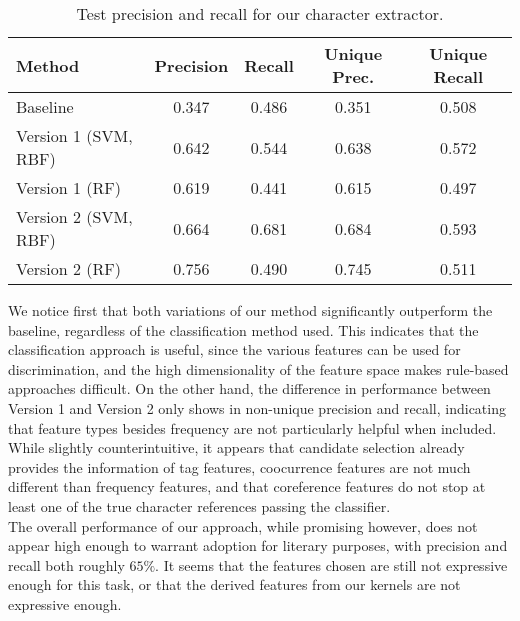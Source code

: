 \documentclass[12pt]{article}
\begin{document}
        \begin{table}[H]
        \begin{center}
            \begin{tabular}{l|c|c|c|c}
                \textbf{Method} & \textbf{Precision} & \textbf{Recall} & \textbf{Unique Prec.} & \textbf{Unique Recall} \\
                \hline
                Baseline & 0.347 & 0.486 & 0.351 & 0.508 \\
                \hline
                Version 1 (SVM, RBF) & 0.642 & 0.544  & 0.638 & 0.572 \\
                \hline
                Version 1 (RF) & 0.619 & 0.441 & 0.615 & 0.497 \\
                \hline
                Version 2 (SVM, RBF) & 0.664 & 0.681 & 0.684 & 0.593 \\
                \hline
                Version 2 (RF) & 0.756 & 0.490 & 0.745 & 0.511  
                
            \end{tabular}
        \end{center}
        \caption{Test precision and recall for our character extractor.}
        \end{table}
        We notice first that both variations of our method significantly outperform the baseline, regardless
        of the classification method used. This indicates that the classification approach is useful,
        since the various features can be used for discrimination, and the high dimensionality of the feature
        space makes rule-based approaches difficult. On the other hand, the difference in performance
        between Version 1 and Version 2 only shows in non-unique precision and recall, indicating that
        feature types besides frequency are not particularly helpful when included. While slightly
        counterintuitive, it appears that candidate selection already provides the information of tag
        features, coocurrence features are not much different than frequency features, and that coreference
        features do not stop at least one of the true character references passing the classifier. \\

        The overall performance of our approach, while promising however, does not appear high enough to warrant
        adoption for literary purposes, with precision and recall both roughly $65\%$. It seems 
        that the features chosen are still not expressive enough for this task, or that the derived features
        from our kernels are not expressive enough. \\
\end{document}

